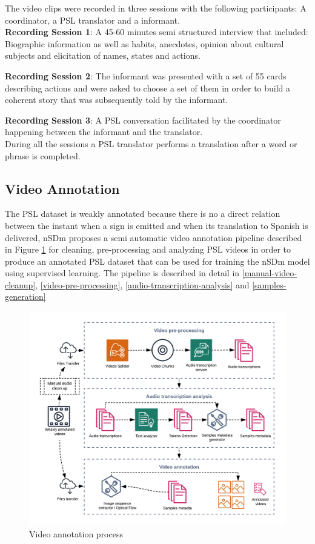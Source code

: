 \documentclass[twocolumn,conference]{article}
\begin{document}
The video clips were recorded in three sessions with the following participants: A coordinator, a PSL \cite{lsp_2015} translator and a informant.\\

\textbf{Recording Session 1}: A 45-60 minutes semi structured interview that included: Biographic information as well as habits, anecdotes, opinion about cultural subjects and elicitation of names, states and actions. 

\textbf{Recording Session 2}: The informant was presented with a set of 55 cards describing actions and were asked to choose a set of them in order to build a coherent story that was subsequently told by the informant.

\textbf{Recording Session 3}: A PSL \cite{lsp_2015} conversation facilitated by the coordinator happening between the informant and the translator.\\

During all the sessions a PSL \cite{lsp_2015} translator performs a translation after a word or phrase is completed.

\subsection{Video Annotation}\label{videoannot}
The PSL dataset is weakly annotated because there is no a direct relation between the instant when a sign is emitted and when its translation to Spanish is delivered, nSDm proposes a semi automatic video annotation pipeline described in Figure \ref{fig:video-annotation-pipeline} for cleaning, pre-processing and analyzing PSL videos in order to produce an annotated PSL dataset that can be used for training the nSDm model using supervised learning. The pipeline is described in detail in \ref{manual-video-cleanup}, \ref{video-pre-processing}, \ref{audio-transcription-analysis} and \ref{samples-generation}

\begin{figure}[hbt!]
\includegraphics[width=\linewidth]{images/video-annotation-pipeline.png}
\caption{Video annotation process}
\label{fig:video-annotation-pipeline}
\end{figure}
\end{document}
